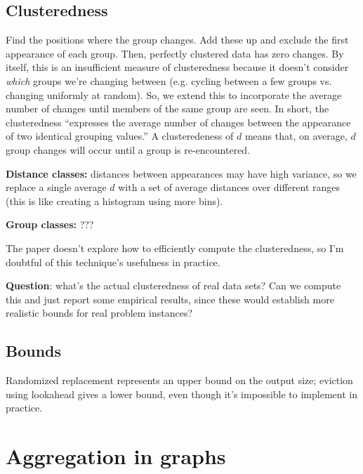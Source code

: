 \documentclass[12pt]{article}
\begin{document}
\subsection{Clusteredness}

Find the positions where the group changes.  Add these up and exclude the first appearance of each group.  Then, perfectly clustered data has zero changes.  By itself, this is an insufficient measure of clusteredness because it doesn't consider \emph{which} groups we're changing between (e.g. cycling between a few groups vs. changing uniformly at random).  So, we extend this to incorporate the average number of changes until members of the same group are seen.  In short, the clusteredness ``expresses the average number of changes between the appearance of two identical grouping values.''  A clusteredeness of $d$ means that, on average, $d$ group changes will occur until a group is re-encountered.


\textbf{Distance classes:} distances between appearances may have high variance, so we replace a single average $d$ with a set of average distances over different ranges (this is like creating a histogram using more bins).

\textbf{Group classes:} ???

The paper doesn't explore how to efficiently compute the clusteredness, so I'm doubtful of this technique's usefulness in practice.

\textbf{Question}: what's the actual clusteredness of real data sets?  Can we compute this and just report some empirical results, since these would establish more realistic bounds for real problem instances?

\subsection{Bounds}

\cite{estimating-cardinality}
Randomized replacement represents an upper bound on the output size; eviction using lookahead gives a lower bound, even though it's impossible to implement in practice.

\section{Aggregation in graphs}





\end{document}
